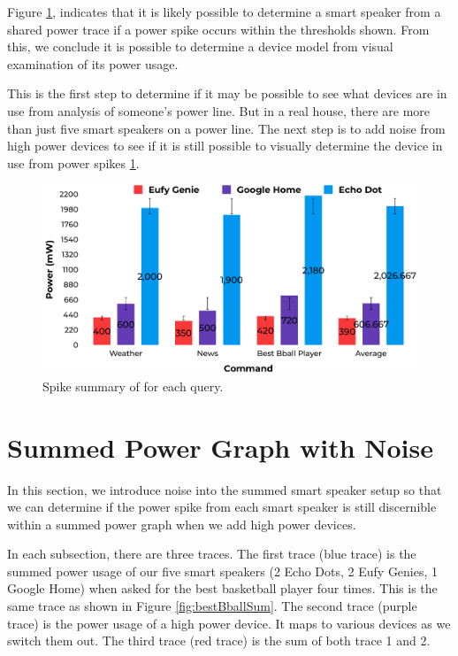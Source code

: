Figure \ref{fig:spikeVoltages}, indicates that it is likely possible to determine a smart speaker from a shared power trace if a power spike occurs within the thresholds shown. From this, we conclude it is possible to determine a device model from visual examination of its power usage.

This is the first step to determine if it may be possible to see what devices are in use from analysis of someone's power line. But in a real house, there are more than just five smart speakers on a power line. The next step is to add noise from high power devices to see if it is still possible to visually determine the device in use from power spikes \ref{sumPowerGraphWithNoise}.

\begin{figure}[H]
  \centering
  \includegraphics[width=1\textwidth]{figures/spikeVoltages.png}
  \caption{Spike summary of for each query.}
  \label{fig:spikeVoltages}
\end{figure}

\section{Summed Power Graph with Noise}
\label{sumPowerGraphWithNoise}
In this section, we introduce noise into the summed smart speaker setup so that we can determine if the power spike from each smart speaker is still discernible within a summed power graph when we add high power devices.

In each subsection, there are three traces. The first trace (blue trace) is the summed power usage of our five smart speakers (2 Echo Dots, 2 Eufy Genies, 1 Google Home) when asked for the best basketball player four times. This is the same trace as shown in Figure \ref{fig:bestBballSum}. The second trace (purple trace) is the power usage of a high power device. It maps to various devices as we switch them out. The third trace (red trace) is the sum of both trace 1 and 2.

